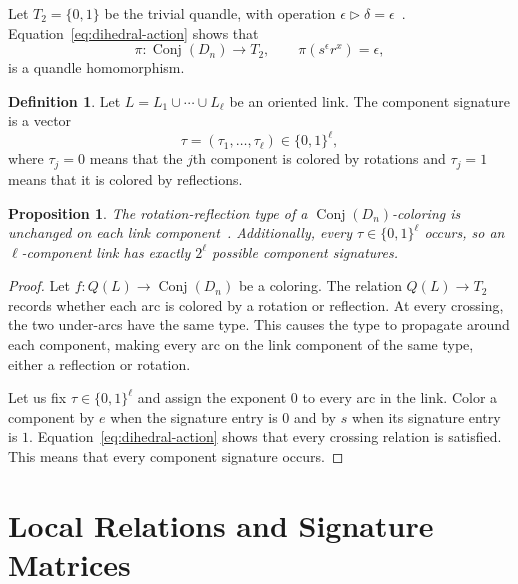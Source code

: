 \documentclass[11pt]{article}
\newtheorem{proposition}[theorem]{Proposition}
\theoremstyle{definition}
\newtheorem{definition}[theorem]{Definition}
\newcommand{\Conj}{\operatorname{Conj}}
\begin{document}
Let $T_2=\{0,1\}$ be the trivial quandle, with operation $\epsilon\triangleright\delta=\epsilon$~\cite[p.~105]{kamada2002}. Equation~\eqref{eq:dihedral-action} shows that
\[
\pi:\Conj(D_n)\longrightarrow T_2,
\qquad
\pi(s^\epsilon r^x)=\epsilon,
\]
is a quandle homomorphism.

\begin{definition}
Let $L=L_1\cup\cdots\cup L_\ell$ be an oriented link. The component signature is a vector
\[
\tau=(\tau_1,\ldots,\tau_\ell)\in\{0,1\}^\ell,
\]
where $\tau_j=0$ means that the $j$th component is colored by rotations and $\tau_j=1$ means that it is colored by reflections.
\end{definition}

\begin{proposition}
The rotation-reflection type of a $\Conj(D_n)$-coloring is unchanged on each link component~\cite[Lemma~2.1(1) and Remark~4]{IIMS2025}. Additionally, every $\tau\in\{0,1\}^\ell$ occurs, so an $\ell$-component link has exactly $2^\ell$ possible component signatures.
\end{proposition}

\begin{proof}
Let $f:Q(L)\to\Conj(D_n)$ be a coloring. The relation $Q(L)\to T_2$ records whether each arc is colored by a rotation or reflection. At every crossing, the two under-arcs have the same type. This causes the type to propagate around each component, making every arc on the link component of the same type, either a reflection or rotation.

Let us fix $\tau\in\{0,1\}^\ell$ and assign the exponent $0$ to every arc in the link. Color a component by $e$ when the signature entry is $0$ and by $s$ when its signature entry is $1$. Equation~\eqref{eq:dihedral-action} shows that every crossing relation is satisfied. This means that every component signature occurs.
\end{proof}

\section{Local Relations and Signature Matrices}
\end{document}
